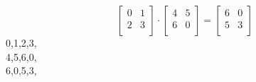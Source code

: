 $$
\left[
\begin{array}{*{2}{r}}
0 & 1\\
2 & 3\\
\end{array}
\right]
\cdot
\left[
\begin{array}{*{2}{r}}
4 & 5\\
6 & 0\\
\end{array}
\right]
=
\left[
\begin{array}{*{2}{r}}
6 & 0\\
5 & 3\\
\end{array}
\right]
$$
0,1,2,3,\\
4,5,6,0,\\
6,0,5,3,\\
